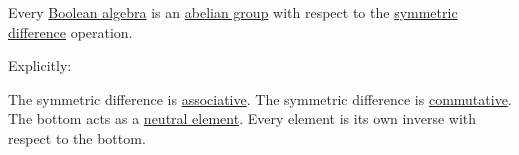\begin{proposition}\label{thm:symmetric_difference_abelian_group}
  Every \hyperref[def:boolean_algebra]{Boolean algebra} is an \hyperref[def:abelian_group]{abelian group} with respect to the \hyperref[def:symmetric_difference]{symmetric difference} operation.

  Explicitly:
  \begin{thmenum}
     The symmetric difference is \hyperref[def:binary_operation/associative]{associative}.
     The symmetric difference is \hyperref[def:binary_operation/commutative]{commutative}.
     The bottom acts as a \hyperref[def:monoid]{neutral element}.
     Every element is its own inverse with respect to the bottom.
  \end{thmenum}
\end{proposition}
